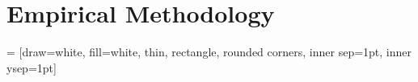 \documentclass[12pt]{article}
\begin{document}



\section{Empirical Methodology}\label{section:methodology}




 = [draw=white, fill=white, thin,
    rectangle, rounded corners, inner sep=1pt, inner ysep=1pt]
\end{document}
